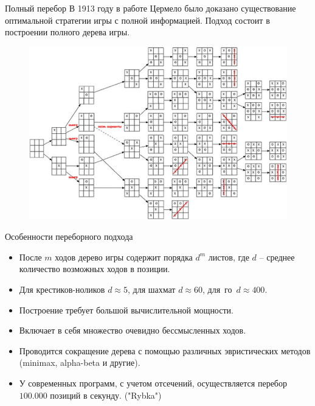 
\begin{frame}{Полный перебор}
В 1913 году в работе Цермело\footnotemark{} было доказано существование оптимальной стратегии игры с полной информацией.
Подход состоит в построении полного дерева игры.
\begin{figure}
\includegraphics[scale=0.3]{./pictures/xoxo.jpg}
\end{figure}
\end{frame}


\begin{frame}{Особенности переборного подхода}
\begin{itemize}
\item После $m$ ходов дерево игры содержит порядка $d^m$ листов, где $d$ -- среднее количество возможных ходов в позиции.
\item Для крестиков-ноликов $d \approx 5$, для шахмат $d \approx 60$, для~го~$d \approx 400$. 
\item Построение требует большой вычислительной мощности.
\item Включает в себя множество очевидно бессмысленных ходов.
\item Проводится сокращение дерева с помощью различных эвристических методов (minimax, alpha-beta и другие).
\item У современных программ, с учетом отсечений, осуществляется перебор $100.000$ позиций в секунду. ("Rybka")
\end{itemize}
\end{frame}

